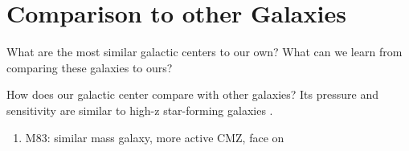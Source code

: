 \section{Comparison to other Galaxies}
What are the most similar galactic centers to our own?
What can we learn from comparing these galaxies to ours?

How does our galactic center compare with other galaxies?  Its pressure and sensitivity are similar to high-z star-forming galaxies \citep{Kruijssen2013a}.  


\begin{enumerate}
    \item M83: similar mass galaxy, more active CMZ, face on
\end{enumerate}
